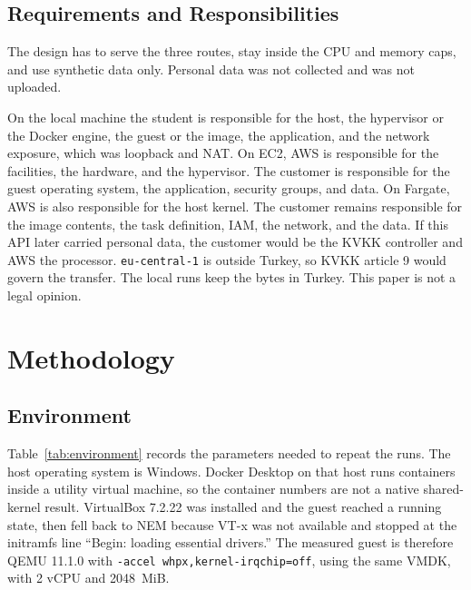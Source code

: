 \documentclass[conference,a4paper]{IEEEtran}
\begin{document}
\subsection{Requirements and Responsibilities}

The design has to serve the three routes, stay inside the CPU and memory caps, and use synthetic data only. Personal data was not collected and was not uploaded.

On the local machine the student is responsible for the host, the hypervisor or the Docker engine, the guest or the image, the application, and the network exposure, which was loopback and NAT. On EC2, AWS is responsible for the facilities, the hardware, and the hypervisor. The customer is responsible for the guest operating system, the application, security groups, and data. On Fargate, AWS is also responsible for the host kernel. The customer remains responsible for the image contents, the task definition, IAM, the network, and the data. If this API later carried personal data, the customer would be the KVKK controller and AWS the processor. \texttt{eu-central-1} is outside Turkey, so KVKK article 9 would govern the transfer. The local runs keep the bytes in Turkey. This paper is not a legal opinion.

\section{Methodology}
\label{sec:methodology}

\subsection{Environment}

Table~\ref{tab:environment} records the parameters needed to repeat the runs. The host operating system is Windows. Docker Desktop on that host runs containers inside a utility virtual machine, so the container numbers are not a native shared-kernel result. VirtualBox 7.2.22 was installed and the guest reached a running state, then fell back to NEM because VT-x was not available and stopped at the initramfs line ``Begin: loading essential drivers.'' The measured guest is therefore QEMU 11.1.0 with \texttt{-accel whpx,kernel-irqchip=off}, using the same VMDK, with 2 vCPU and 2048~MiB.
\end{document}
